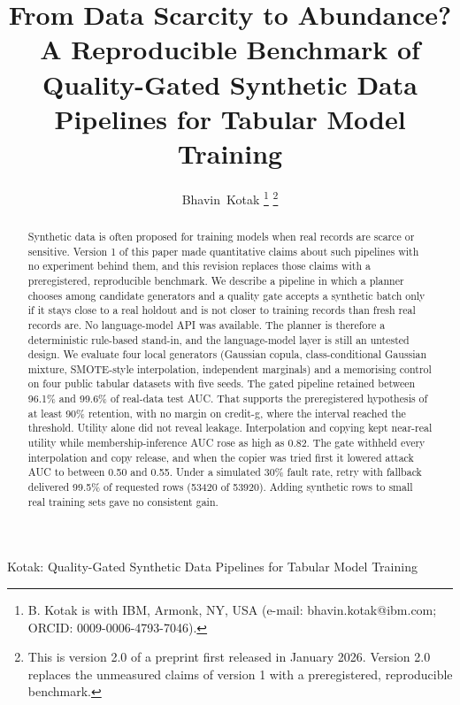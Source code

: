\documentclass[journal]{IEEEtran}
\begin{document}
\title{From Data Scarcity to Abundance? A Reproducible Benchmark of Quality-Gated Synthetic Data Pipelines for Tabular Model Training}

\author{Bhavin~Kotak%
\thanks{B. Kotak is with IBM, Armonk, NY, USA (e-mail: bhavin.kotak@ibm.com; ORCID: 0009-0006-4793-7046).}%
\thanks{This is version 2.0 of a preprint first released in January 2026. Version 2.0 replaces the unmeasured claims of version 1 with a preregistered, reproducible benchmark.}%
}

%
{Kotak: Quality-Gated Synthetic Data Pipelines for Tabular Model Training}

\maketitle

\begin{abstract}
Synthetic data is often proposed for training models when real records are scarce or sensitive. Version 1 of this paper made quantitative claims about such pipelines with no experiment behind them, and this revision replaces those claims with a preregistered, reproducible benchmark. We describe a pipeline in which a planner chooses among candidate generators and a quality gate accepts a synthetic batch only if it stays close to a real holdout and is not closer to training records than fresh real records are. No language-model API was available. The planner is therefore a deterministic rule-based stand-in, and the language-model layer is still an untested design. We evaluate four local generators (Gaussian copula, class-conditional Gaussian mixture, SMOTE-style interpolation, independent marginals) and a memorising control on four public tabular datasets with five seeds. The gated pipeline retained between 96.1\% and 99.6\% of real-data test AUC. That supports the preregistered hypothesis of at least 90\% retention, with no margin on credit-g, where the interval reached the threshold. Utility alone did not reveal leakage. Interpolation and copying kept near-real utility while membership-inference AUC rose as high as 0.82. The gate withheld every interpolation and copy release, and when the copier was tried first it lowered attack AUC to between 0.50 and 0.55. Under a simulated 30\% fault rate, retry with fallback delivered 99.5\% of requested rows (53420 of 53920). Adding synthetic rows to small real training sets gave no consistent gain.
\end{abstract}
\end{document}
